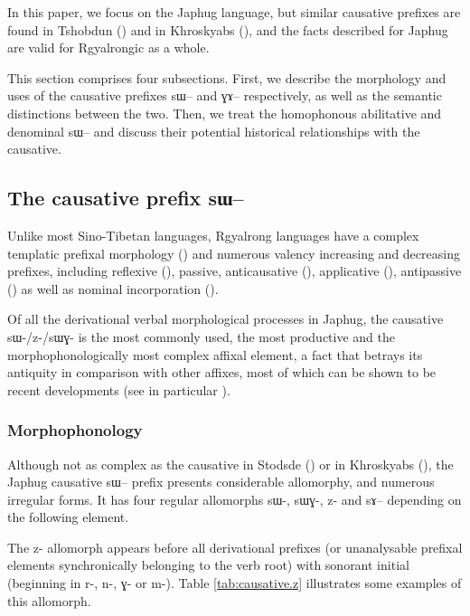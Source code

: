 \documentclass[oldfontcommands,oneside,a4paper,11pt]{article}
\newcommand{\ipa}[1]{{\phon \mbox{#1}}} %
\begin{document}
In this paper, we focus on the Japhug language, but similar causative prefixes are found in Tshobdun (\citealt{jackson06paisheng, jackson14morpho}) and in Khroskyabs (\citealt{lai13affixale,lai14caus}), and the facts described for Japhug are  valid for Rgyalrongic as a whole.

This section comprises four subsections. First, we describe the morphology and uses of the causative prefixes \ipa{sɯ--} and \ipa{ɣɤ--} respectively, as well as the semantic distinctions between the two. Then, we treat the homophonous abilitative and denominal \ipa{sɯ--} and discuss their potential historical relationships with the causative.


\subsection{The causative prefix  \ipa{sɯ--}}

Unlike most Sino-Tibetan languages, Rgyalrong languages have a complex templatic prefixal morphology (\citealt{jacques13harmonization, jackson14morpho}) and numerous valency increasing and decreasing prefixes, including reflexive (\citealt{jacques10refl}), passive, anticausative (\citealt{jacques12demotion}), applicative (\citealt{jacques13tropative}), antipassive (\citealt{jacques14antipassive}) as well as nominal incorporation (\citealt{jacques12incorp}).

Of all the derivational verbal morphological processes in Japhug, the causative \ipa{sɯ-/z-/sɯɣ-} is the most commonly used, the most productive and the morphophonologically most complex affixal element, a fact that betrays its antiquity in comparison with other affixes, most of which can be shown to be recent developments (see in particular \citealt{jacques14antipassive}).

\subsubsection{Morphophonology} \label{subsub:caus:morphophon}
Although not as complex as the causative in Stodsde (\citealt{jackson07shangzhai}) or in Khroskyabs (\citealt{lai14caus}), the Japhug causative   \ipa{sɯ--} prefix presents  considerable allomorphy, and numerous irregular forms. It has four regular allomorphs \ipa{sɯ-}, \ipa{sɯɣ-}, \ipa{z-} and \ipa{sɤ--} depending on the following element.

The \ipa{z-} allomorph appears before all derivational prefixes (or unanalysable prefixal elements synchronically belonging to the verb root) with sonorant initial (beginning in \ipa{r-}, \ipa{n-}, \ipa{ɣ-} or \ipa{m-}). Table \ref{tab:causative.z} illustrates some examples of this allomorph.
\end{document}
